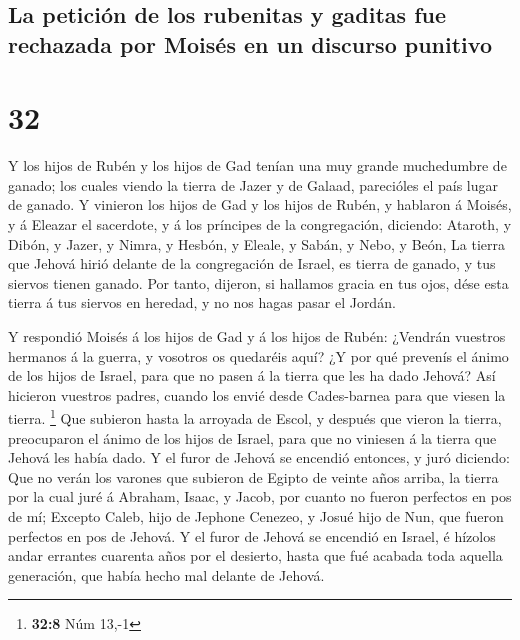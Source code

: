 \hypertarget{la-peticiuxf3n-de-los-rubenitas-y-gaditas-fue-rechazada-por-moisuxe9s-en-un-discurso-punitivo}{%
\subsection{La petición de los rubenitas y gaditas fue rechazada por
Moisés en un discurso
punitivo}\label{la-peticiuxf3n-de-los-rubenitas-y-gaditas-fue-rechazada-por-moisuxe9s-en-un-discurso-punitivo}}

\hypertarget{section-31}{%
\section{32}\label{section-31}}

 Y los hijos de Rubén y los hijos de Gad tenían una muy
grande muchedumbre de ganado; los cuales viendo la tierra de Jazer y de
Galaad, parecióles el país lugar de ganado.  Y vinieron los
hijos de Gad y los hijos de Rubén, y hablaron á Moisés, y á Eleazar el
sacerdote, y á los príncipes de la congregación, diciendo: 
Ataroth, y Dibón, y Jazer, y Nimra, y Hesbón, y Eleale, y Sabán, y Nebo,
y Beón,  La tierra que Jehová hirió delante de la
congregación de Israel, es tierra de ganado, y tus siervos tienen
ganado.  Por tanto, dijeron, si hallamos gracia en tus ojos,
dése esta tierra á tus siervos en heredad, y no nos hagas pasar el
Jordán.

 Y respondió Moisés á los hijos de Gad y á los hijos de
Rubén: ¿Vendrán vuestros hermanos á la guerra, y vosotros os quedaréis
aquí?  ¿Y por qué prevenís el ánimo de los hijos de Israel,
para que no pasen á la tierra que les ha dado Jehová?  Así
hicieron vuestros padres, cuando los envié desde Cades-barnea para que
viesen la tierra. \footnote{\textbf{32:8} Núm 13,-1}  Que
subieron hasta la arroyada de Escol, y después que vieron la tierra,
preocuparon el ánimo de los hijos de Israel, para que no viniesen á la
tierra que Jehová les había dado.  Y el furor de Jehová se
encendió entonces, y juró diciendo:  Que no verán los
varones que subieron de Egipto de veinte años arriba, la tierra por la
cual juré á Abraham, Isaac, y Jacob, por cuanto no fueron perfectos en
pos de mí;  Excepto Caleb, hijo de Jephone Cenezeo, y Josué
hijo de Nun, que fueron perfectos en pos de Jehová.  Y el
furor de Jehová se encendió en Israel, é hízolos andar errantes cuarenta
años por el desierto, hasta que fué acabada toda aquella generación, que
había hecho mal delante de Jehová.

